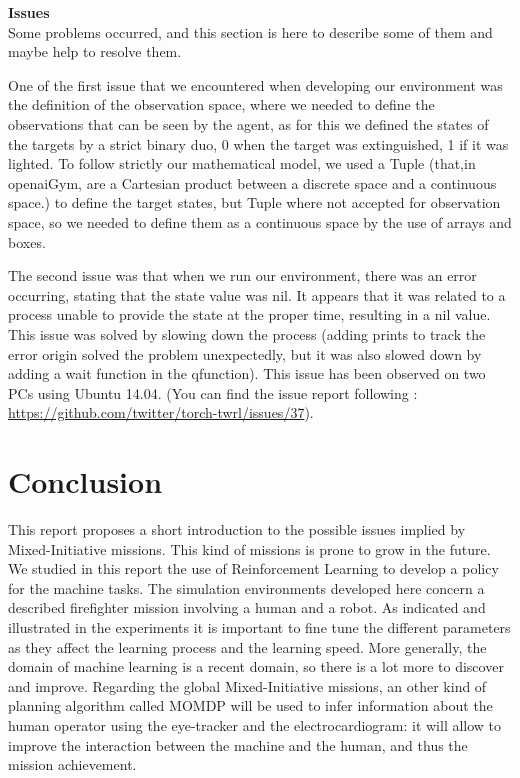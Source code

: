 \documentclass[conference]{IEEEtran}
\begin{document}
\textbf{Issues}\\

Some problems occurred, and this section is here to describe some of them and maybe help to resolve them.

One of the first issue that we encountered when developing our environment was the definition of the observation space, where we needed to define the observations that can be seen by the agent, as for this we defined the states of the targets by a strict binary duo, 0 when the target was extinguished, 1 if it was lighted. To follow strictly our mathematical model, we used a Tuple (that,in openaiGym, are a Cartesian product between a discrete space and a continuous space.) to define the target states, but Tuple where not accepted for observation space, so we needed to define them as a continuous space by the use of arrays and boxes.


The second issue was that when we run our environment, there was an error occurring, stating that the state value was nil. It appears that it was related to a process unable to provide the state at the proper time, resulting in a nil value. This issue was solved by slowing down the process (adding prints to track the error origin solved the problem unexpectedly, but it was also slowed down by adding a wait function in the qfunction). This issue has been observed on two PCs using Ubuntu 14.04. (You can find the issue report following : \url{https://github.com/twitter/torch-twrl/issues/37}).

\section{Conclusion}

This report proposes a short introduction to the possible issues implied by Mixed-Initiative missions.
This kind of missions is prone to grow in the future. 
We studied in this report the use of Reinforcement Learning to develop a policy for the machine tasks.
The simulation environments developed here concern a described firefighter mission involving a human and a robot.
As indicated and illustrated in the experiments it is important to fine tune the different parameters 
as they affect the learning process and the learning speed.
More generally, the domain of machine learning
is a recent domain, so there is a lot more to discover and improve.
Regarding the global Mixed-Initiative missions, 
an other kind of planning algorithm called MOMDP will be used
to infer information about the human operator using the eye-tracker and the electrocardiogram: 
it will allow to improve the interaction between the machine and the human,
and thus the mission achievement.
\end{document}
